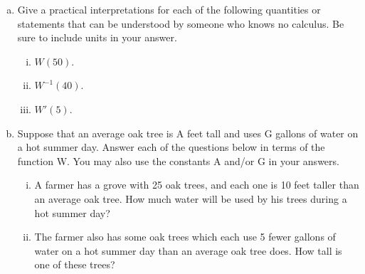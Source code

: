 \documentclass[11pt]{exam}
\begin{document}
\begin{questions}
\begin{enumerate}[(a)]	
\item Give a practical interpretations for each of the following quantities or statements that can be understood by someone who knows no calculus. Be sure to include units in your answer.
\begin{multicols}{3}
	\begin{enumerate}[(i)]
		\item $W(50)$.
		\item $W^{-1}(40)$.
		\item $W'(5)$.
	\end{enumerate}
\end{multicols}	
	\item Suppose that an average oak tree is A feet tall and uses G gallons of water on a hot summer day. Answer each of the questions below in terms of the function W. You may also use the constants A and/or G in your answers.
\begin{enumerate}[(i)]
	\item A farmer has a grove with 25 oak trees, and each one is 10 feet taller than an average oak tree. How much water will be used by his trees during a hot summer day?
	\item The farmer also has some oak trees which each use 5 fewer gallons of water on a hot summer day than an average oak tree does. How tall is one of these trees?
\end{enumerate}


\end{enumerate}
\end{questions}
\end{document}
